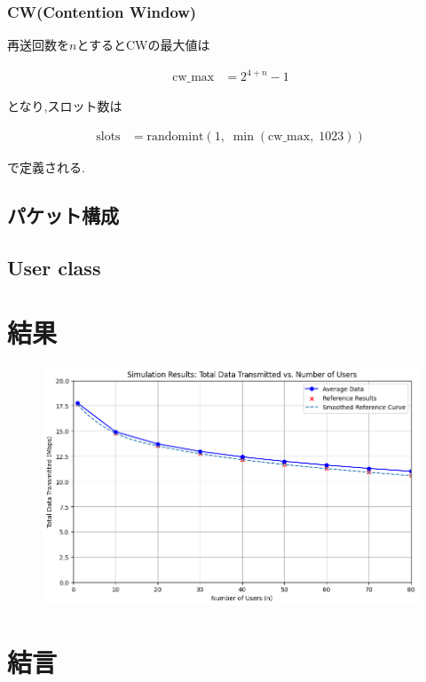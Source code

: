 \documentclass[a4paper, 10pt]{ltjsarticle}
\begin{document}
\subsubsection{CW(Contention Window)}

再送回数を$n$とするとCWの最大値は

\begin{align}
  \text{cw\_max} &= 2^{4 + n} - 1
\end{align}

となり,スロット数は

\begin{align}
  \text{slots} &= \mathrm{randomint}(1, \; \min(\text{cw\_max}, \; 1023))
\end{align}

で定義される.


\subsection{パケット構成}

\subsection{User class}


\section{結果}

\begin{figure}[h]
  \centering
  \includegraphics[width=0.9\columnwidth]{./assets/graph.png}
\end{figure}

\section{結言}
\end{document}
